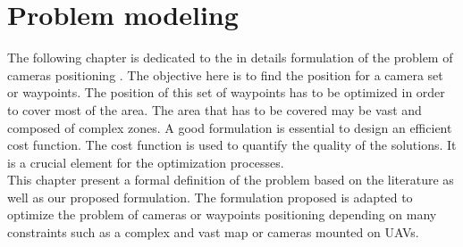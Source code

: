 \chapter{Problem modeling}\label{chap:formulation}
\minitoc

%
%	




The following chapter is dedicated to the in details formulation of the problem of cameras positioning . 
The objective here is to find the position for a camera set or waypoints. The position of this set of waypoints has to be optimized in order to cover most of the area. The area that has to be covered may be vast and composed of complex zones.
A good formulation is essential to design an efficient cost function. The cost function is used to quantify the quality of the solutions. It is a crucial element for the optimization processes.\\
This chapter present a formal definition of the problem based on the literature as well as our proposed formulation. 
The formulation proposed is adapted to optimize the problem of cameras or waypoints positioning depending on many constraints such as  a complex and vast map or  cameras mounted on UAVs.

